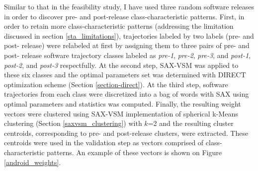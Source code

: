 Similar to that in the feasibility study, I have used three random software releases in order to discover pre- and post-release class-characteristic patterns. First, in order to retain more class-characteristic patterns (addressing the limitation discussed in section \ref{sta_limitations}), trajectories labeled by two labels (pre- and post- release) were relabeled at first by assigning them to three pairs of  pre- and post- release software trajectory classes labeled as \textit{pre-1}, \textit{pre-2}, \textit{pre-3}, and \textit{post-1}, \textit{post-2}, and \textit{post-3} respectfully. At the second step, SAX-VSM was applied to these six classes and the optimal parameters set was determined with DIRECT optimization scheme (Section \ref{section-direct}). At the third step, software trajectories from each class were discretized into a bag of words with SAX using optimal parameters and \tfidf statistics was computed. Finally, the resulting weight vectors were clustered using SAX-VSM implementation of spherical k-Means clustering (Section \ref{saxvsm_clustering}) with $k$=2 and the resulting cluster centroids, corresponding to pre- and post-release clusters, were extracted. These centroids were used in the validation step as vectors comprised of class-characteristic patterns. An example of these vectors is shown on Figure \ref{android_weights}.


